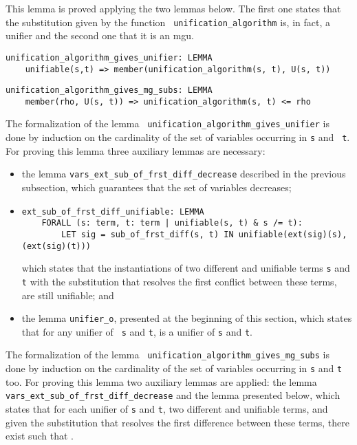 \documentclass[submission,copyright,creativecommons]{eptcs}
\begin{document}
This lemma is proved applying the two lemmas below.  The first one
states that the substitution given by the function {\tt
  unification\_algorithm} is, in fact, a unifier and the second one
that it is an mgu.

{\small
\begin{verbatim}
unification_algorithm_gives_unifier: LEMMA
    unifiable(s,t) => member(unification_algorithm(s, t), U(s, t))
\end{verbatim}
} {\small
\begin{verbatim}
unification_algorithm_gives_mg_subs: LEMMA
    member(rho, U(s, t)) => unification_algorithm(s, t) <= rho
\end{verbatim}
}

The formalization of the lemma {\tt
  unification\_algorithm\_gives\_unifier} is done by induction on the
cardinality of the set of variables occurring in {\tt s} and {\tt
  t}. For proving this lemma three auxiliary lemmas are necessary:

\begin{itemize}
\item the lemma {\tt vars\_ext\_sub\_of\_frst\_diff\_decrease}
  described in the previous subsection, which guarantees that the set
  of variables decreases;
\item {\small
\begin{verbatim}
ext_sub_of_frst_diff_unifiable: LEMMA
    FORALL (s: term, t: term | unifiable(s, t) & s /= t):
        LET sig = sub_of_frst_diff(s, t) IN unifiable(ext(sig)(s), (ext(sig)(t)))
\end{verbatim}
  } which states that the instantiations of two different and
  unifiable terms {\tt s} and {\tt t} with
  the substitution  that resolves the first conflict between
  these terms, are still unifiable; and

\item the lemma {\tt unifier\_o}, presented at the beginning of this
  section, which states that for any unifier  of {\tt
    s} and {\tt t},  is
  a unifier of {\tt s} and {\tt t}.
\end{itemize}

The formalization of the lemma {\tt
  unification\_algorithm\_gives\_mg\_subs} is done by induction on the
cardinality of the set of variables occurring in {\tt s} and {\tt t}
too. For proving this lemma two auxiliary lemmas are applied: the
lemma {\tt vars\_ext\_sub\_of\_frst\_diff\_decrease} and the lemma
presented below, which states that for each unifier  of {\tt s}
and {\tt t}, two different and unifiable terms, and given  the
substitution that resolves the first difference between these terms,
there exist  such that .
                
\end{document}
